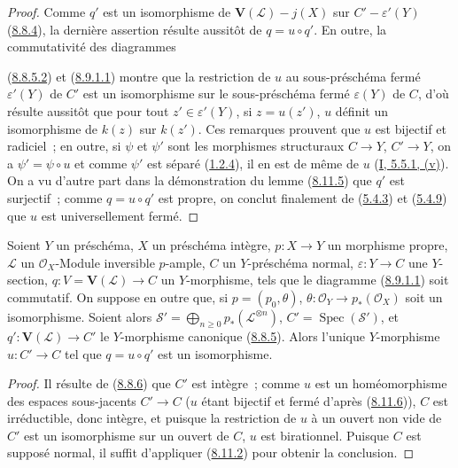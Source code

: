 \begin{proof}
Comme $q'$ est un isomorphisme de $\mathbf{V}(\mathcal{L})-j(X)$ sur
$C'-\varepsilon'(Y)$ (\hyperref[II.8.8.4-fr]{8.8.4}), la dernière assertion
résulte aussitôt de $q=u\circ q'$. En outre, la commutativité des diagrammes

(\hyperref[II.8.8.5.2-fr]{8.8.5.2}) et
(\hyperref[II.8.9.1.1-fr]{8.9.1.1}) montre que la restriction de $u$ au
sous-préschéma fermé $\varepsilon'(Y)$ de $C'$ est un isomorphisme sur le
sous-préschéma fermé $\varepsilon(Y)$ de $C$, d'où résulte aussitôt que pour
tout $z'\in\varepsilon'(Y)$, si $z=u(z')$, $u$ définit un isomorphisme de
$k(z)$ sur $k(z')$. Ces remarques prouvent que $u$ est bijectif et radiciel~;
en outre, si $\psi$ et $\psi'$ sont les morphismes structuraux $C\to Y$,
$C'\to Y$, on a $\psi'=\psi\circ u$ et comme $\psi'$ est séparé
(\hyperref[II.1.2.4-fr]{1.2.4}), il en est de même de $u$
(\hyperref[I.5.5.1-fr]{I, 5.5.1, (v)}). On a vu d'autre part dans la
démonstration du lemme (\hyperref[II.8.11.5-fr]{8.11.5}) que $q'$ est
surjectif~; comme $q=u\circ q'$ est propre, on conclut finalement de
(\hyperref[II.5.4.3-fr]{5.4.3}) et (\hyperref[II.5.4.9-fr]{5.4.9}) que $u$
est universellement fermé.
\end{proof}

\begin{proposition}[8.11.7]
\label{II.8.11.7-fr}
Soient $Y$ un préschéma, $X$ un préschéma intègre, $p:X\to Y$ un morphisme
propre, $\mathcal{L}$ un $\mathcal{O}_X$-Module inversible $p$-ample, $C$ un
$Y$-préschéma normal, $\varepsilon:Y\to C$ une $Y$-section,
$q:V=\mathbf{V}(\mathcal{L})\to C$ un $Y$-morphisme, tels que le diagramme
(\hyperref[II.8.9.1.1-fr]{8.9.1.1}) soit commutatif. On suppose en outre que,
si $p=(p_0,\theta)$, $\theta:\mathcal{O}_Y\to p_*(\mathcal{O}_X)$ soit un
isomorphisme. Soient alors
$\mathcal{S}'=\bigoplus_{n\geqslant0}p_*(\mathcal{L}^{\otimes n})$,
$C'=\operatorname{Spec}(\mathcal{S}')$, et
$q':\mathbf{V}(\mathcal{L})\to C'$ le $Y$-morphisme canonique
(\hyperref[II.8.8.5-fr]{8.8.5}). Alors l'unique $Y$-morphisme $u:C'\to C$ tel
que $q=u\circ q'$ est un isomorphisme.
\end{proposition}

\begin{proof}
Il résulte de (\hyperref[II.8.8.6-fr]{8.8.6}) que $C'$ est intègre~; comme
$u$ est un homéomorphisme des espaces sous-jacents $C'\to C$ ($u$ étant
bijectif et fermé d'après (\hyperref[II.8.11.6-fr]{8.11.6})), $C$ est
irréductible, donc intègre, et puisque la restriction de $u$ à un ouvert non
vide de $C'$ est un isomorphisme sur un ouvert de $C$, $u$ est birationnel.
Puisque $C$ est supposé normal, il suffit d'appliquer
(\hyperref[II.8.11.2-fr]{8.11.2}) pour obtenir la conclusion.
\end{proof}


